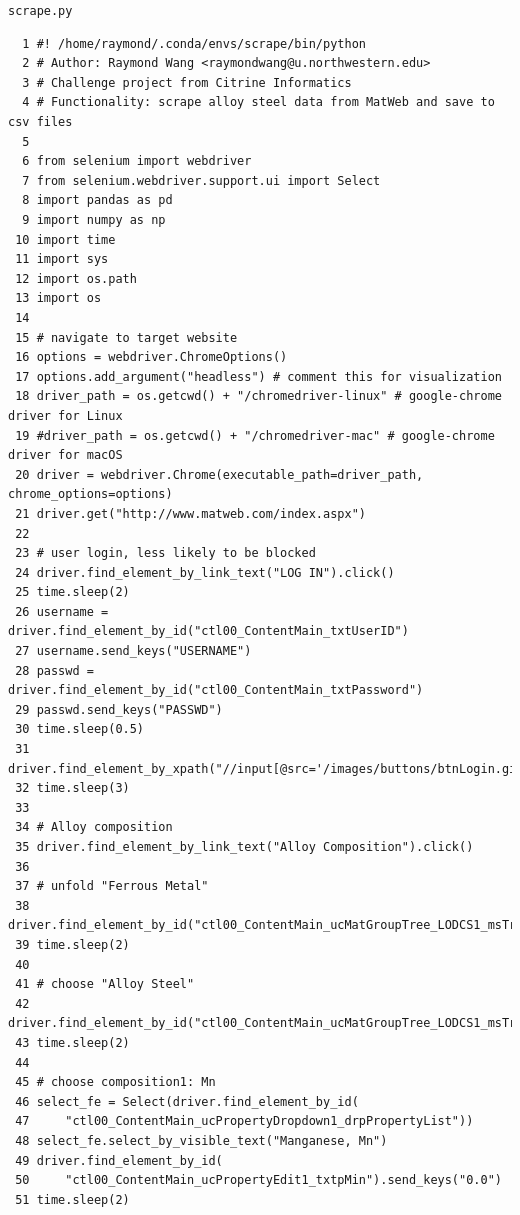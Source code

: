 \documentclass[10pt,aps,prb,amsmath,amssymb,twocolumn,letterpaper,nobalancelastpage,final,citeautoscript,floatfix,raggedbottom,superscriptaddress]{revtex4-1}
\begin{document}
\noindent \texttt{\Large{scrape.py}\label{code:scrape}}
\begin{lstlisting}
  1 #! /home/raymond/.conda/envs/scrape/bin/python
  2 # Author: Raymond Wang <raymondwang@u.northwestern.edu>
  3 # Challenge project from Citrine Informatics
  4 # Functionality: scrape alloy steel data from MatWeb and save to csv files
  5 
  6 from selenium import webdriver
  7 from selenium.webdriver.support.ui import Select
  8 import pandas as pd
  9 import numpy as np
 10 import time
 11 import sys
 12 import os.path
 13 import os
 14 
 15 # navigate to target website
 16 options = webdriver.ChromeOptions()
 17 options.add_argument("headless") # comment this for visualization
 18 driver_path = os.getcwd() + "/chromedriver-linux" # google-chrome driver for Linux
 19 #driver_path = os.getcwd() + "/chromedriver-mac" # google-chrome driver for macOS
 20 driver = webdriver.Chrome(executable_path=driver_path, chrome_options=options)
 21 driver.get("http://www.matweb.com/index.aspx")
 22 
 23 # user login, less likely to be blocked
 24 driver.find_element_by_link_text("LOG IN").click()
 25 time.sleep(2)
 26 username = driver.find_element_by_id("ctl00_ContentMain_txtUserID")
 27 username.send_keys("USERNAME")
 28 passwd =  driver.find_element_by_id("ctl00_ContentMain_txtPassword")
 29 passwd.send_keys("PASSWD")
 30 time.sleep(0.5)
 31 driver.find_element_by_xpath("//input[@src='/images/buttons/btnLogin.gif']").click()
 32 time.sleep(3)
 33 
 34 # Alloy composition
 35 driver.find_element_by_link_text("Alloy Composition").click()
 36 
 37 # unfold "Ferrous Metal"
 38 driver.find_element_by_id("ctl00_ContentMain_ucMatGroupTree_LODCS1_msTreeViewn1").click()
 39 time.sleep(2)
 40 
 41 # choose "Alloy Steel"
 42 driver.find_element_by_id("ctl00_ContentMain_ucMatGroupTree_LODCS1_msTreeViewt6").click()
 43 time.sleep(2)
 44 
 45 # choose composition1: Mn
 46 select_fe = Select(driver.find_element_by_id(
 47     "ctl00_ContentMain_ucPropertyDropdown1_drpPropertyList"))
 48 select_fe.select_by_visible_text("Manganese, Mn")
 49 driver.find_element_by_id(
 50     "ctl00_ContentMain_ucPropertyEdit1_txtpMin").send_keys("0.0")
 51 time.sleep(2)
\end{lstlisting}
\clearpage
\end{document}
